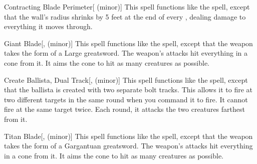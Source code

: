 \lowercase{\hypertarget{spell:Contracting Blade Perimeter}{}}\label{spell:Contracting Blade Perimeter}
\begin{freeability}[\nth{3}]{\hypertarget{spell:Contracting Blade Perimeter}{Contracting Blade Perimeter}}[ (minor)]
This spell functions like the  spell, except that the wall's radius shrinks by 5 feet at the end of every , dealing damage to everything it moves through.
\end{freeability}
\vspace{0.25em}



\lowercase{\hypertarget{spell:Giant Blade}{}}\label{spell:Giant Blade}
\begin{freeability}[\nth{3}]{\hypertarget{spell:Giant Blade}{Giant Blade}}[,  (minor)]
This spell functions like the  spell, except that the weapon takes the form of a Large greatsword.
The weapon's attacks hit everything in a \areasmall cone from it.
It aims the cone to hit as many creatures as possible.
\end{freeability}
\vspace{0.25em}



\lowercase{\hypertarget{spell:Create Ballista, Dual Track}{}}\label{spell:Create Ballista, Dual Track}
\begin{freeability}[\nth{4}]{\hypertarget{spell:Create Ballista, Dual Track}{Create Ballista, Dual Track}}[,  (minor)]
This spell functions like the  spell, except that the ballista is created with two separate bolt tracks.
This allows it to fire at two different targets in the same round when you command it to fire.
It cannot fire at the same target twice.
Each round, it attacks the two creatures farthest from it.
\end{freeability}
\vspace{0.25em}



\lowercase{\hypertarget{spell:Titan Blade}{}}\label{spell:Titan Blade}
\begin{freeability}[\nth{6}]{\hypertarget{spell:Titan Blade}{Titan Blade}}[,  (minor)]
This spell functions like the  spell, except that the weapon takes the form of a Gargantuan greatsword.
The weapon's attacks hit everything in a \areamed cone from it.
It aims the cone to hit as many creatures as possible.
\end{freeability}
\vspace{0.25em}



